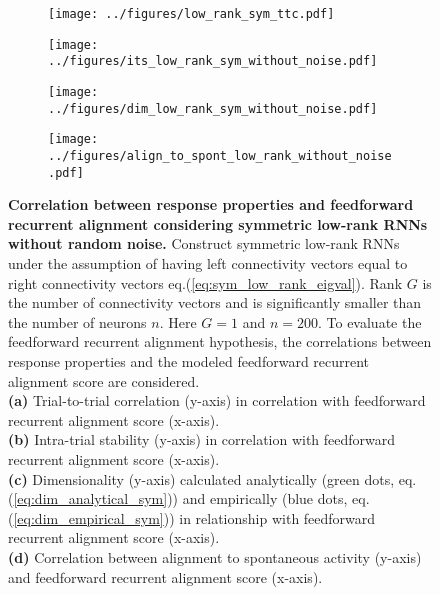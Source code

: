 \documentclass[11pt]{article}
\begin{document}
%	
		\begin{figure}[H]
			\centering
			\begin{subfigure}[b]{0.45\textwidth}
				\texttt{[image: ../figures/low\_rank\_sym\_ttc.pdf]}
				\caption{}
			\end{subfigure}
			\hfill
			\begin{subfigure}[b]{0.45\textwidth}
				\texttt{[image: ../figures/its\_low\_rank\_sym\_without\_noise.pdf]}
				\caption{}
			\end{subfigure}
			\newline
			\begin{subfigure}[b]{0.45\textwidth}
				\texttt{[image: ../figures/dim\_low\_rank\_sym\_without\_noise.pdf]}
				\caption{}
			\end{subfigure}
			\hfill
			\begin{subfigure}[b]{0.45\textwidth}
				\texttt{[image: ../figures/align\_to\_spont\_low\_rank\_without\_noise.pdf]}
				\caption{}
			\end{subfigure}
			\caption[Correlation between response properties and feedforward recurrent alignment considering symmetric low-rank RNNs without random noise]{\textbf{Correlation between response properties and feedforward recurrent alignment considering symmetric low-rank RNNs without random noise.} Construct symmetric low-rank RNNs under the assumption of having left connectivity vectors equal to right connectivity vectors eq.(\ref{eq:sym_low_rank_eigval}). Rank $G$ is the number of connectivity vectors and is significantly smaller than the number of neurons $n$. Here $G = 1$ and $n = 200$. To evaluate the feedforward recurrent alignment hypothesis, the correlations between response properties and the modeled feedforward recurrent alignment score are considered. \\
			\textbf{(a)} Trial-to-trial correlation (y-axis) in correlation with feedforward recurrent alignment score (x-axis).\\
			\textbf{(b)} Intra-trial stability (y-axis) in correlation with feedforward recurrent alignment score (x-axis).\\
			\textbf{(c)} Dimensionality (y-axis) calculated analytically (green dots, eq.(\ref{eq:dim_analytical_sym})) and empirically (blue dots, eq.(\ref{eq:dim_empirical_sym})) in relationship with feedforward recurrent alignment score (x-axis).\\
			\textbf{(d)} Correlation between alignment to spontaneous activity (y-axis) and feedforward recurrent alignment score (x-axis).}
		

\end{figure}
\end{document}
